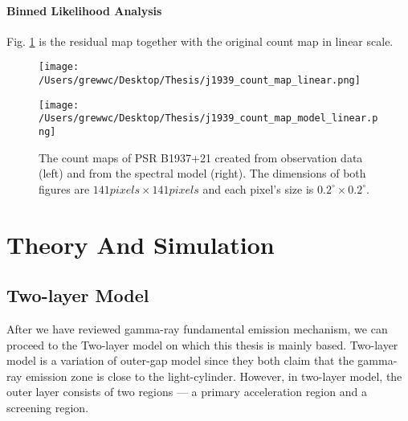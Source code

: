 \documentclass[12pt]{report}
\begin{document}
        \subsubsection{Binned Likelihood Analysis}
          Fig. \ref{fig: j1939_count_map_diff} is the residual map together with the 
          original count map in linear scale.
          \begin{figure}[!ht]
            \begin{center}
            \begin{minipage}{0.45\textwidth}
              \begin{center} 
                \texttt{[image: /Users/grewwc/Desktop/Thesis/j1939\_count\_map\_linear.png]}
              \end{center}
            \end{minipage}
            \begin{minipage}{0.45\textwidth}
              \begin{center}
                \texttt{[image: /Users/grewwc/Desktop/Thesis/j1939\_count\_map\_model\_linear.png]}
              \end{center}
            \end{minipage}
          \end{center}
          \caption{The count maps of PSR B1937+21 created from observation 
          data (\textsf{left}) and from the spectral model (\textsf{right}). The dimensions
          of both figures are $141 pixels \times 141 pixels$ and each pixel's size is
          $0.2^{\circ}\times0.2^{\circ}$.}

          \label{fig: j1939_count_map_diff}
        \end{figure}
        \vspace{1cm}

    \chapter{Theory And Simulation}
      \section{Two-layer Model}
        After we have reviewed gamma-ray fundamental emission mechanism, we can proceed to
        the Two-layer model on which this thesis is mainly based. Two-layer model is a 
        variation of outer-gap model since they both claim that the gamma-ray emission zone
        is close to the light-cylinder. However, in two-layer model, the outer layer 
        consists of two regions --- a primary acceleration region and a screening region. 
\end{document}
